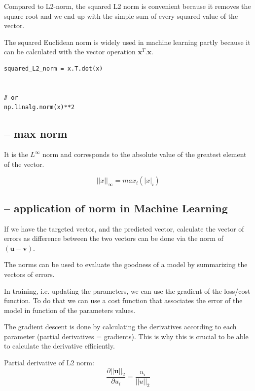 Compared to L2-norm, the squared L2 norm is convenient because it removes the
square root and we end up with the simple sum of every squared value of the
vector.

The squared Euclidean norm is widely used in machine learning partly because it
can be calculated with the vector operation $\mathbf{x}^T.\mathbf{x}$.

\begin{lstlisting}
squared_L2_norm = x.T.dot(x)


# or
np.linalg.norm(x)**2
\end{lstlisting}

\subsection{-- max norm}


It is the $L^\infty$ norm and corresponds to the absolute value of the greatest
element of the vector.

\begin{equation}
||x||_\infty = max_i (|x|_i)
\end{equation}



\subsection{-- application of norm in Machine Learning}

If we have the targeted vector, and the predicted vector, calculate the vector
of errors as difference between the two vectors can be done via the norm of
$(\mathbf{u} - \mathbf{v})$.


The norms can be used to evaluate the goodness of a model by summarizing the vectors of errors.

In training, i.e. updating the parameters, we can use the gradient of the
loss/cost function.
To do that we can use a cost function that associates the error of the model in
function of the parameters values.

The gradient descent is done by calculating the derivatives according to each
parameter (partial derivatives = gradients). This is why this is crucial to be
able to calculate the derivative efficiently.

Partial derivative of L2 norm:
\begin{equation}
\frac{\partial ||\mathbf{u}||_2}{\partial u_i} = \frac{u_i}{||u||_2}
\end{equation}

